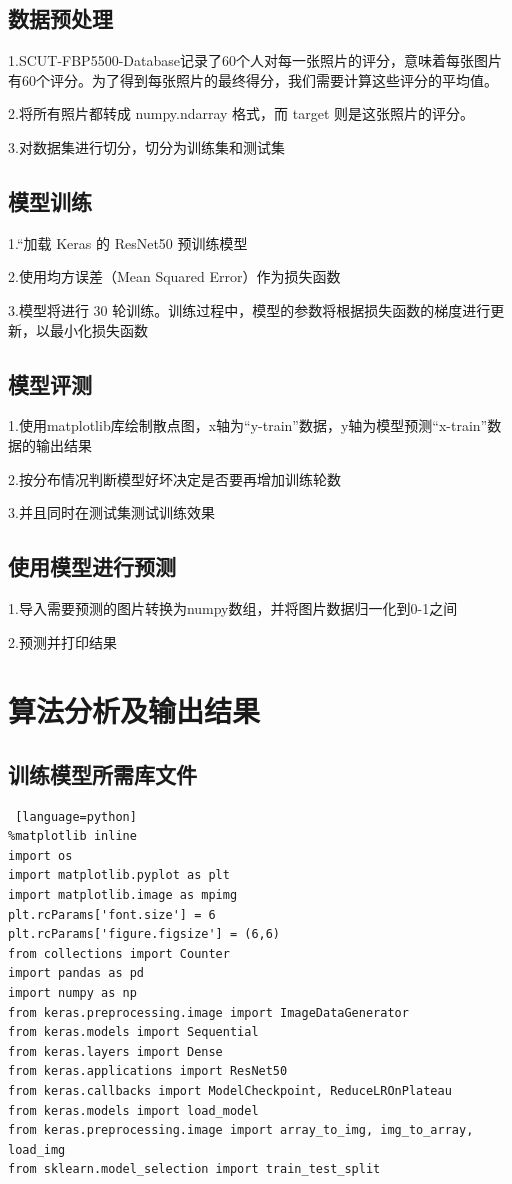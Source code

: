 \documentclass{article}
\begin{document}
\subsection{数据预处理}
1.SCUT-FBP5500-Database记录了60个人对每一张照片的评分，意味着每张图片有60个评分。为了得到每张照片的最终得分，我们需要计算这些评分的平均值。\par
2.将所有照片都转成 numpy.ndarray 格式，而 target 则是这张照片的评分。\par
3.对数据集进行切分，切分为训练集和测试集\par

\subsection{模型训练}
1.“加载 Keras 的 ResNet50 预训练模型\par
2.使用均方误差（Mean Squared Error）作为损失函数\par
3.模型将进行 30 轮训练。训练过程中，模型的参数将根据损失函数的梯度进行更新，以最小化损失函数\par

\subsection{模型评测}
1.使用matplotlib库绘制散点图，x轴为“y-train”数据，y轴为模型预测“x-train”数据的输出结果\par
2.按分布情况判断模型好坏决定是否要再增加训练轮数\par
3.并且同时在测试集测试训练效果\par

\subsection{使用模型进行预测}
1.导入需要预测的图片转换为numpy数组，并将图片数据归一化到0-1之间\par
2.预测并打印结果\par





\section{算法分析及输出结果}
\subsection{训练模型所需库文件}
\begin{lstlisting} [language=python]
%matplotlib inline
import os
import matplotlib.pyplot as plt
import matplotlib.image as mpimg
plt.rcParams['font.size'] = 6
plt.rcParams['figure.figsize'] = (6,6)
from collections import Counter
import pandas as pd
import numpy as np
from keras.preprocessing.image import ImageDataGenerator
from keras.models import Sequential
from keras.layers import Dense
from keras.applications import ResNet50
from keras.callbacks import ModelCheckpoint, ReduceLROnPlateau
from keras.models import load_model
from keras.preprocessing.image import array_to_img, img_to_array, load_img
from sklearn.model_selection import train_test_split
\end{lstlisting}
\end{document}
